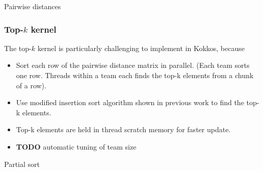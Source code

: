 \documentclass[conference]{IEEEtran}
\begin{document}
\begin{algorithm}
    \SetAlgoLined
    \DontPrintSemicolon
    \caption{Pairwise distances}%
    \label{alg:distances}
\end{algorithm}

\subsubsection{Top-$k$ kernel}

The top-$k$ kernel is particularly challenging to implement in Kokkos, because

\begin{itemize}
\item Sort each row of the pairwise distance matrix in parallel. (Each team sorts one row. Threads within a team each finds the top-k elements from a chunk of a row).
\item Use modified insertion sort algorithm shown in previous work to find the top-k elements.
\item Top-k elements are held in thread scratch memory for faster update.
\item \textbf{TODO} automatic tuning of team size
\end{itemize}


\begin{algorithm}
    \SetAlgoLined
    \DontPrintSemicolon
    \caption{Partial sort}%
    \label{alg:partial-sort}
\end{algorithm}
\end{document}
